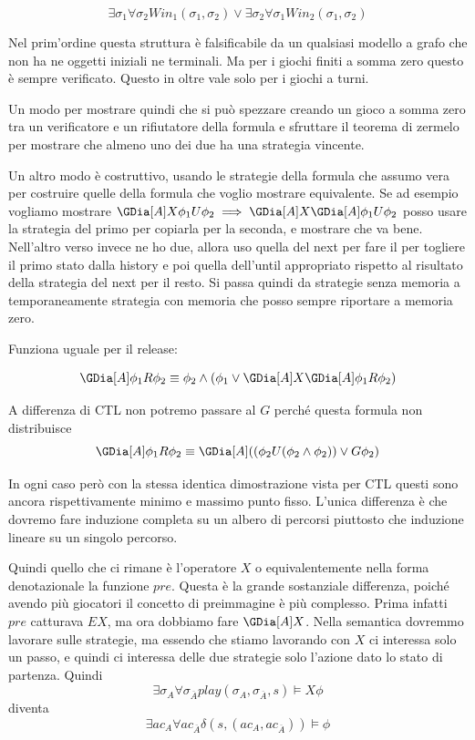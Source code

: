 \[\exists \sigma_1 \forall \sigma_2 Win_1(\sigma_1,\sigma_2) \lor \exists \sigma_2 \forall \sigma_1 Win_2(\sigma_1,\sigma_2) \]

Nel prim'ordine questa struttura è falsificabile da un qualsiasi modello a grafo che non ha ne oggetti iniziali ne terminali. Ma per i giochi finiti a somma zero questo è sempre verificato. Questo in oltre vale solo per i giochi a turni.

Un modo per mostrare quindi che si può spezzare creando un gioco a somma zero tra un verificatore e un rifiutatore della formula e sfruttare il teorema di zermelo per mostrare che almeno uno dei due ha una strategia vincente. 

Un altro modo è costruttivo, usando le strategie della formula che assumo vera per costruire quelle della formula che voglio mostrare equivalente. Se ad esempio vogliamo mostrare \(\GDia[A] X \phi_1 U\phi_2 \implies \GDia[A] X \GDia[A] \phi_1 U\phi_2\) posso usare la strategia del primo per copiarla per la seconda, e mostrare che va bene. Nell'altro verso invece ne ho due, allora uso quella del next per fare il per togliere il primo stato dalla history e poi quella dell'until appropriato rispetto al risultato della strategia del next per il resto. Si passa quindi da strategie senza memoria a temporaneamente strategia con memoria che posso sempre riportare a memoria zero.

Funziona uguale per il release:

\[\GDia[A] \phi_1 R \phi_2 \equiv \phi_2 \land (\phi_1 \lor \GDia[A] X \GDia[A] \phi_1 R\phi_2)\]

A differenza di CTL non potremo passare al \(G\) perché questa formula non distribuisce
\[\GDia[A] \phi_1 R \phi_2 \equiv \GDia[A] ((\phi_2 U (\phi_2 \land \phi_2)) \lor G \phi_2)\]

In ogni caso però con la stessa identica dimostrazione vista per CTL questi sono ancora rispettivamente minimo e massimo punto fisso. L'unica differenza è che dovremo fare induzione completa su un albero di percorsi piuttosto che induzione lineare su un singolo percorso.

Quindi quello che ci rimane è l'operatore \(X\) o equivalentemente nella forma denotazionale la funzione \(pre\). Questa è la grande sostanziale differenza, poiché avendo più giocatori il concetto di preimmagine è più complesso. Prima infatti \(pre\) catturava \(EX\), ma ora dobbiamo fare \(\GDia[A]X\). Nella semantica dovremmo lavorare sulle strategie, ma essendo che stiamo lavorando con \(X\) ci interessa solo un passo, e quindi ci interessa delle due strategie solo l'azione dato lo stato di partenza. Quindi
\[\exists \sigma_A \forall \sigma_{\overline{A}} play(\sigma_A,\sigma_{\overline{A}},s) \models X\phi \]
diventa
\[\exists {ac}_{A} \forall {ac}_{\overline{A}} \delta(s, ({ac}_A, {ac}_{\overline{A}})) \models \phi\]

